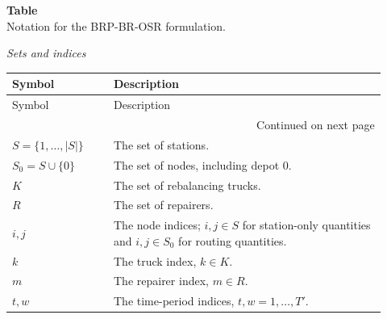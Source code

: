 {\vspace{0.8\baselineskip}
\renewcommand{\baselinestretch}{1}\small
\renewcommand{\arraystretch}{1.0}
\setlength{\LTpre}{0.4\baselineskip}
\setlength{\LTpost}{0.4\baselineskip}
\label{tab:notation}
\noindent\textbf{Table~\thetable}\\
\noindent Notation for the BRP-BR-OSR formulation.

\medskip
\noindent\textit{Sets and indices}
\smallskip
\begin{longtable}{@{}p{0.25\linewidth}p{0.67\linewidth}@{}}
\toprule
Symbol & Description \\
\midrule
\endfirsthead
\toprule
Symbol & Description \\
\midrule
\endhead
\midrule
\multicolumn{2}{r}{Continued on next page}\\
\endfoot
\bottomrule
\endlastfoot
$S=\{1,\ldots,|S|\}$ & The set of stations. \\
$S_0=S\cup\{0\}$ & The set of nodes, including depot $0$. \\
$K$ & The set of rebalancing trucks. \\
$R$ & The set of repairers. \\
$i,j$ & The node indices; $i,j\in S$ for station-only quantities and $i,j\in S_0$ for routing quantities. \\
$k$ & The truck index, $k\in K$. \\
$m$ & The repairer index, $m\in R$. \\
$t,w$ & The time-period indices, $t,w=1,\ldots,T'$. \\
\end{longtable}

}
